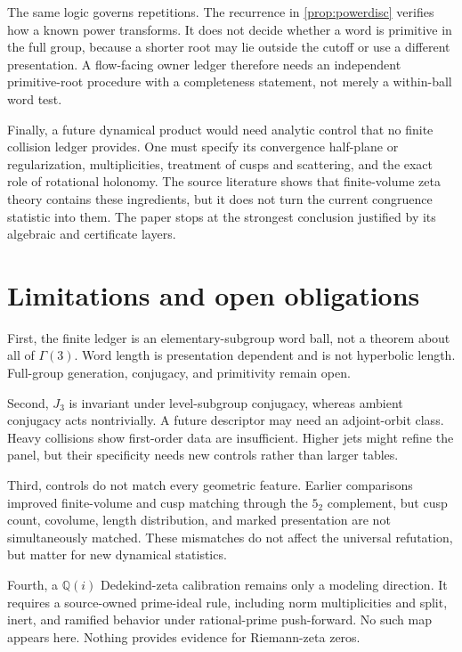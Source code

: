\documentclass[11pt,a4paper]{article}
\theoremstyle{definition}
\theoremstyle{remark}
\begin{document}
The same logic governs repetitions. The recurrence in \cref{prop:powerdisc} verifies how a known power transforms. It does not decide whether a word is primitive in the full group, because a shorter root may lie outside the cutoff or use a different presentation. A flow-facing owner ledger therefore needs an independent primitive-root procedure with a completeness statement, not merely a within-ball word test.

Finally, a future dynamical product would need analytic control that no finite collision ledger provides. One must specify its convergence half-plane or regularization, multiplicities, treatment of cusps and scattering, and the exact role of rotational holonomy. The source literature shows that finite-volume zeta theory contains these ingredients, but it does not turn the current congruence statistic into them. The paper stops at the strongest conclusion justified by its algebraic and certificate layers.

\section{Limitations and open obligations}

First, the finite ledger is an elementary-subgroup word ball, not a theorem about all of \(\Gamma(3)\). Word length is presentation dependent and is not hyperbolic length. Full-group generation, conjugacy, and primitivity remain open.

Second, \(J_3\) is invariant under level-subgroup conjugacy, whereas ambient conjugacy acts nontrivially. A future descriptor may need an adjoint-orbit class. Heavy collisions show first-order data are insufficient. Higher jets might refine the panel, but their specificity needs new controls rather than larger tables.

Third, controls do not match every geometric feature. Earlier comparisons improved finite-volume and cusp matching through the \(5_2\) complement, but cusp count, covolume, length distribution, and marked presentation are not simultaneously matched. These mismatches do not affect the universal refutation, but matter for new dynamical statistics.

Fourth, a \(\mathbb Q(i)\) Dedekind-zeta calibration remains only a modeling direction. It requires a source-owned prime-ideal rule, including norm multiplicities and split, inert, and ramified behavior under rational-prime push-forward. No such map appears here. Nothing provides evidence for Riemann-zeta zeros.
\end{document}
